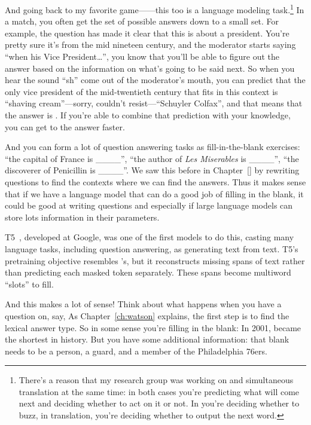 And going back to my favorite game---\quizbowl{}---this too is a language modeling task.\footnote{There's a reason that my research group was working on \quizbowl{} and simultaneous translation at the same time: in both cases you're predicting what will come next and deciding whether to act on it or not.  In \quizbowl{} you're deciding whether to buzz, in translation, you're deciding whether to output the next word.}
%
In a \quizbowl{} match, you often get the set of possible answers down to a small set.
%
For example, the question has made it clear that this is about a  president.  You're pretty sure it's from the mid nineteen century, and the moderator starts saying ``when his Vice President\dots'', you know that you'll be able to figure out the answer based on the information on what's going to be said next.
%
So when you hear the sound ``sh'' come out of the moderator's mouth, you can predict that the only vice president of the mid-twentieth century that fits in this context is ``shaving cream''---sorry, couldn't resist---``Schuyler Colfax'', and that means that the answer is . 
%
If you're able to combine that prediction with your knowledge, you can get to the answer faster.

And you can form a lot of question answering tasks as fill-in-the-blank exercises:
%
``the capital of France is \_\_\_\_'', ``the author of \textit{Les Miserables} is \_\_\_\_'', ``the discoverer of Penicillin is \_\_\_\_''.  
%
We saw this before in Chapter~\ref{} by rewriting questions to find the contexts where we can find the answers.
%
Thus it makes sense that if we have a language model that can do a good job of filling in the blank, it could be good at writing questions and especially if large language models can store lots information in their parameters.  

T5~\citep{raffel-20}, developed at Google, was one of the first models to do this, casting many language tasks, including question answering, as generating text from text.
%
T5's pretraining objective resembles 's, but it reconstructs missing spans of text rather than predicting each masked token separately.  
%
These spans become multiword ``slots'' to fill.

And this makes a lot of sense!  Think about what happens when you have a question on, say, \jeopardyf{}  As Chapter~\ref{ch:watson} explains, the first step is to find the lexical answer type.  So in some sense you're filling in the blank: In 2001, \underline{\hspace{2cm}} became the shortest   in history.  But you have some additional information: that blank needs to be a person, a guard, and a member of the Philadelphia 76ers.

